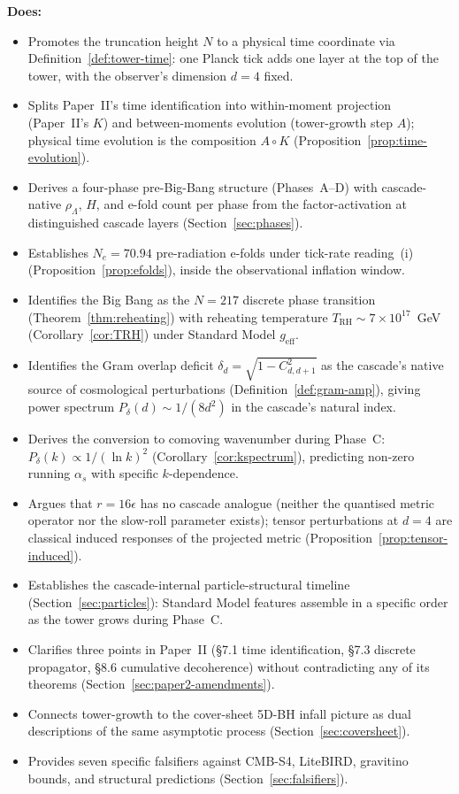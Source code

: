 \documentclass[12pt,a4paper]{article}
\begin{document}
\textbf{Does:}
\begin{itemize}[leftmargin=*,nosep]
\item Promotes the truncation height $N$ to a physical time coordinate via
Definition~\ref{def:tower-time}: one Planck tick adds one layer at the top of
the tower, with the observer's dimension $d = 4$ fixed.
\item Splits Paper~II's time identification into within-moment projection
(Paper~II's $K$) and between-moments evolution (tower-growth step $A$);
physical time evolution is the composition $A \circ K$
(Proposition~\ref{prop:time-evolution}).
\item Derives a four-phase pre-Big-Bang structure (Phases~A--D) with
cascade-native $\rho_\Lambda$, $H$, and e-fold count per phase from the
factor-activation at distinguished cascade layers (Section~\ref{sec:phases}).
\item Establishes $N_e = 70.94$ pre-radiation e-folds under tick-rate
reading~(i) (Proposition~\ref{prop:efolds}), inside the observational
inflation window.
\item Identifies the Big Bang as the $N = 217$ discrete phase transition
(Theorem~\ref{thm:reheating}) with reheating temperature $T_{\mathrm{RH}}
\sim 7 \times 10^{17}$~GeV (Corollary~\ref{cor:TRH}) under Standard Model
$g_{\mathrm{eff}}$.
\item Identifies the Gram overlap deficit $\delta_d = \sqrt{1 - C_{d,d+1}^2}$
as the cascade's native source of cosmological perturbations
(Definition~\ref{def:gram-amp}), giving power spectrum $P_\delta(d) \sim
1/(8d^2)$ in the cascade's natural index.
\item Derives the conversion to comoving wavenumber during Phase~C:
$P_\delta(k) \propto 1/(\ln k)^2$ (Corollary~\ref{cor:kspectrum}), predicting
non-zero running $\alpha_s$ with specific $k$-dependence.
\item Argues that $r = 16\epsilon$ has no cascade analogue (neither the
quantised metric operator nor the slow-roll parameter exists); tensor
perturbations at $d = 4$ are classical induced responses of the projected
metric (Proposition~\ref{prop:tensor-induced}).
\item Establishes the cascade-internal particle-structural timeline
(Section~\ref{sec:particles}): Standard Model features assemble in a
specific order as the tower grows during Phase~C.
\item Clarifies three points in Paper~II (\S7.1 time identification, \S7.3
discrete propagator, \S8.6 cumulative decoherence) without contradicting any
of its theorems (Section~\ref{sec:paper2-amendments}).
\item Connects tower-growth to the cover-sheet 5D-BH infall picture as dual
descriptions of the same asymptotic process (Section~\ref{sec:coversheet}).
\item Provides seven specific falsifiers against CMB-S4, LiteBIRD, gravitino
bounds, and structural predictions (Section~\ref{sec:falsifiers}).
\end{itemize}
\end{document}
